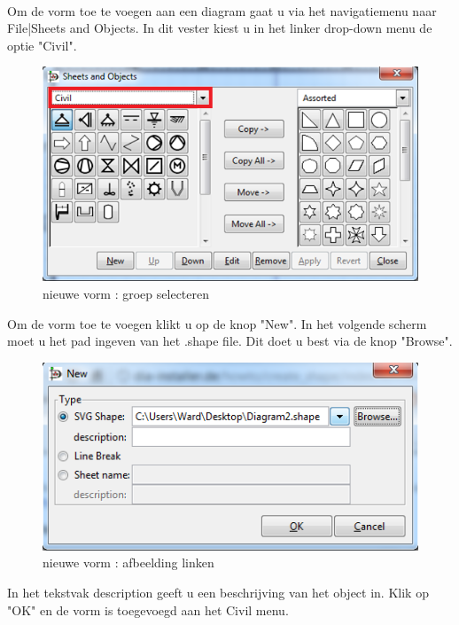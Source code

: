 \documentclass[12pt,a4paper]{report}
\begin{document}
\begin{flushleft}
\paragraph*{}
Om de vorm toe te voegen aan een diagram gaat u via het navigatiemenu naar File|Sheets and Objects. In dit vester kiest u in het linker drop-down menu de optie "Civil".
\begin{figure}[H]
\includegraphics[scale=1]{images/shape_02.png}
\centering
\vspace{-25pt}
\caption{nieuwe vorm : groep selecteren} 
\end{figure}
Om de vorm toe te voegen klikt u op de knop "New". In het volgende scherm moet u het pad ingeven van het .shape file. Dit doet u best via de knop "Browse".
\begin{figure}[H]
\includegraphics[scale=1]{images/shape_03.png}
\centering
\vspace{-10pt}
\caption{nieuwe vorm : afbeelding linken} 
\end{figure}
In het tekstvak description geeft u een beschrijving van het object in. Klik op "OK" en de vorm is toegevoegd aan het Civil menu.

\end{flushleft}
\end{document}

